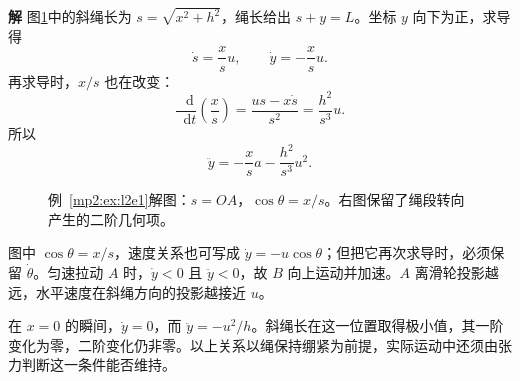\documentclass[11pt,openany,fontset=fandol]{ctexbook}
\theoremstyle{definition}\newtheorem{example}{例}[chapter]\newtheorem{exercise}{习题}[chapter]
\newcommand{\SolutionStart}{\par\medskip\ifdim\pagetotal>0pt\ifdim\dimexpr\pagegoal-\pagetotal\relax<3\baselineskip\newpage\fi\fi\noindent\textbf{解}\quad\ignorespaces}
\newenvironment{solution}{\SolutionStart}{\par\medskip}
\newcommand{\dd}{\mathop{}\!\mathrm d}\newcommand{\ee}{\mathrm e}\newcommand{\vct}[1]{\bm{#1}}
\begin{document}
\begin{solution}
图\ref{mp2:fig:l2e1-s}中的斜绳长为 $s=\sqrt{x^2+h^2}$，绳长给出 $s+y=L$。坐标 $y$ 向下为正，求导得
\[
\dot s=\frac{x}{s}u,\qquad \dot y=-\frac{x}{s}u.
\]
再求导时，$x/s$ 也在改变：
\[
\frac{\dd}{\dd t}\left(\frac xs\right)
=\frac{us-x\dot s}{s^2}
=\frac{h^2}{s^3}u.
\]
所以
\begin{equation}\label{mp2:eq:l2-rope-acc}
\ddot y=-\frac xs a-\frac{h^2}{s^3}u^2.
\end{equation}

\begin{figure}[H]\centering
{}
\caption{例~\ref{mp2:ex:l2e1}解图：$s=OA$，$\cos\theta=x/s$。右图保留了绳段转向产生的二阶几何项。}\label{mp2:fig:l2e1-s}
\end{figure}

图中 $\cos\theta=x/s$，速度关系也可写成 $\dot y=-u\cos\theta$；但把它再次求导时，必须保留 $\dot\theta$。匀速拉动 $A$ 时，$\dot y<0$ 且 $\ddot y<0$，故 $B$ 向上运动并加速。$A$ 离滑轮投影越远，水平速度在斜绳方向的投影越接近 $u$。

在 $x=0$ 的瞬间，$\dot y=0$，而 $\ddot y=-u^2/h$。斜绳长在这一位置取得极小值，其一阶变化为零，二阶变化仍非零。以上关系以绳保持绷紧为前提，实际运动中还须由张力判断这一条件能否维持。

\end{solution}
\end{document}
